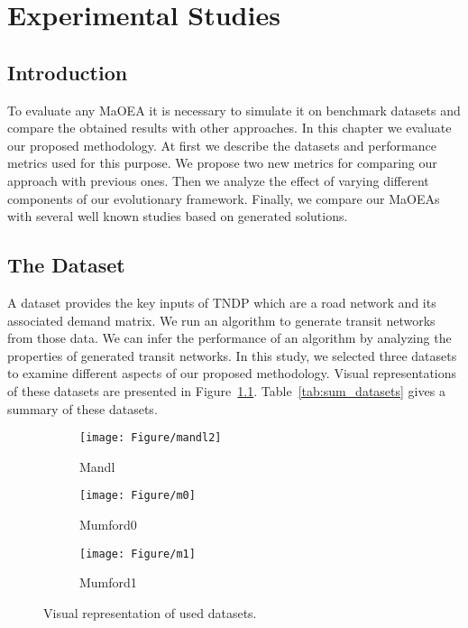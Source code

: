 \chapter{Experimental Studies}
\label{chapter4}

\section{Introduction}
To evaluate any MaOEA it is necessary to simulate it on benchmark datasets and compare the obtained results with other approaches. In this chapter we evaluate our proposed methodology. At first we describe the datasets and performance metrics used for this purpose. We propose two new metrics for comparing our approach with previous ones. Then we analyze the effect of varying different components of our evolutionary framework. Finally, we compare our MaOEAs with several well known studies based on generated solutions.


\section{The Dataset}
A dataset provides the key inputs of TNDP which are a road network and its associated demand matrix. We run an algorithm to generate transit networks from those data. We can infer the performance of an algorithm by analyzing the properties of generated transit networks. In this study, we selected three datasets to examine different aspects of our proposed methodology. Visual representations of these datasets are presented in Figure~\ref{fig:datasets}. Table~\ref{tab:sum_datasets} gives a summary of these datasets. 

\begin{figure}[!htbp]
	\centering
	\begin{subfigure}[b]{0.33\textwidth}
		\texttt{[image: Figure/mandl2]}
		\caption{Mandl}
	\end{subfigure}%
	\begin{subfigure}[b]{0.33\textwidth}
		\texttt{[image: Figure/m0]}
		\caption{Mumford0}
	\end{subfigure}%
	\begin{subfigure}[b]{0.33\textwidth}
		\texttt{[image: Figure/m1]}
		\caption{Mumford1}
	\end{subfigure}%
	\caption{Visual representation of used datasets.}
	\label{fig:datasets}
\end{figure}

